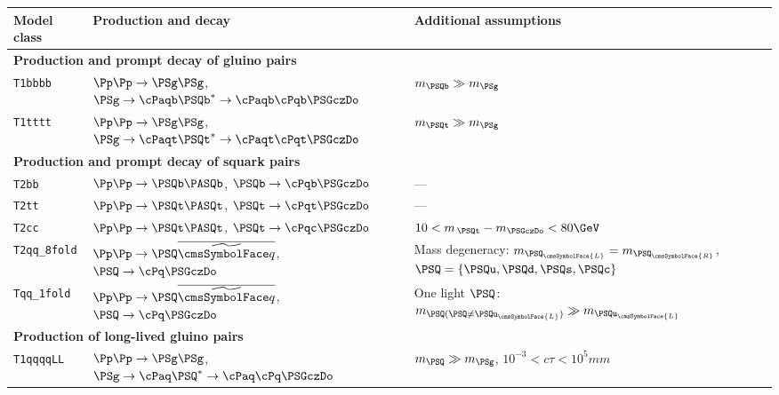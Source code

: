 \begin{table}[!h]
  \label{tab:sms}
  \centering
  \begin{tabular}{ lll }
    \hline
    Model class\T\B
  & Production and decay
  & Additional assumptions\B                                                                           \\
    \hline
    \multicolumn{3}{l}{\bf Production and prompt decay of gluino pairs}\T                              \\
    \texttt{T1bbbb}
  & $\Pp\Pp \to \PSg\PSg$,
  $\PSg\to \cPaqb\PSQb^* \to \cPaqb\cPqb\PSGczDo$
  & $m_{\PSQb} \gg m_{\PSg}$\B                                                                         \\
    \texttt{T1tttt}
  & $\Pp\Pp \to \PSg\PSg$,
  $\PSg\to \cPaqt\PSQt^* \to \cPaqt\cPqt\PSGczDo$                                                                   
  & $m_{\PSQt} \gg m_{\PSg}$\B                                                                         \\
    \multicolumn{3}{l}{\bf Production and prompt decay of squark pairs}\T                              \\
    \texttt{T2bb}
  & $\Pp\Pp \to \PSQb\PASQb$,
  $\PSQb \to \cPqb\PSGczDo$
  & ---                                                                                                \\
    \texttt{T2tt}
  & $\Pp\Pp \to \PSQt\PASQt$,
  $\PSQt \to \cPqt\PSGczDo$
  & ---                                                                                                \\
    \texttt{T2cc}
  & $\Pp\Pp \to \PSQt\PASQt$,
  $\PSQt\to \cPqc\PSGczDo$
  & $10 < m_{\,\PSQt} - m_{\PSGczDo} < 80\GeV$\B                                                       \\
    \texttt{T2qq\_8fold}
  & $\Pp\Pp \to \PSQ\PASQ$,
  $\PSQ \to \cPq\PSGczDo$
  & Mass degeneracy: $m_{\PSQ_\cmsSymbolFace{L}} = m_{\PSQ_\cmsSymbolFace{R}}$,
  $\PSQ = \{ \PSQu, \PSQd, \PSQs, \PSQc \}$                                                            \\
  \texttt{Tqq\_1fold}
  & $\Pp\Pp \to \PSQ\PASQ$,
  $\PSQ \to \cPq\PSGczDo$
  & One light $\PSQ$: $m_{\PSQ (\PSQ \neq \PSQu_\cmsSymbolFace{L})} \gg m_{\PSQu_\cmsSymbolFace{L}}$\B \\
  \multicolumn{3}{l}{\bf Production of long-lived gluino pairs}\T                                      \\
  \texttt{T1qqqqLL}
  & $\Pp\Pp \to \PSg\PSg$,
  $\PSg \to \cPaq\PSQ^* \to \cPaq\cPq\PSGczDo$    
  & $m_{\PSQ} \gg m_{\PSg}$, $10^{-3} < c\tau < 10^{5}\unit{mm}$\B                               \\
  \hline
  \end{tabular}
\end{table}

